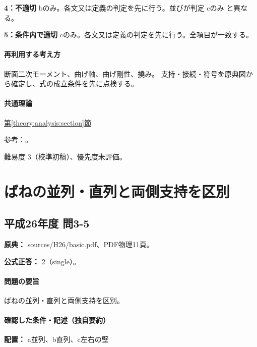 \noindent\textbf{4：不適切} bのみ。各文又は定義の判定を先に行う。並びが判定 cのみ と異なる。\par

\noindent\textbf{5：条件内で適切} cのみ。各文又は定義の判定を先に行う。全項目が一致する。\par

\paragraph{再利用する考え方} 断面二次モーメント、曲げ軸、曲げ剛性、撓み。 支持・接続・符号を原典図から確定し、式の成立条件を先に点検する。

\paragraph{共通理論} \hyperref[theory:analysis:section]{第\ref*{theory:analysis:section}節}

\par 参考：\cite{struct_mit_beam}。

\par 難易度 3（校準初稿）、優先度未評価。

\section{ばねの並列・直列と両側支持を区別}

\subsection{平成26年度 問3-5}
\label{q:h26-reg-basic-3-5}

\noindent\textbf{原典：} sources/H26/basic.pdf、PDF物理11頁。

\textbf{公式正答：} 2（single）。

\paragraph{問題の要旨} ばねの並列・直列と両側支持を区別。

\paragraph{確認した条件・記述（独自要約）}\mbox{}\par

\noindent\textbf{配置：} a並列、b直列、c左右の壁\par

